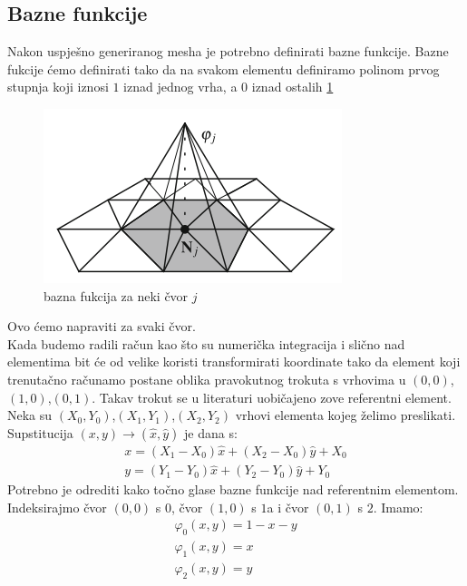 \documentclass[zavrsnirad]{../fer}
\begin{document}
\newpage
\subsection{Bazne funkcije}

Nakon uspješno generiranog mesha je potrebno definirati
bazne funkcije. Bazne fukcije ćemo definirati tako da
na svakom elementu definiramo polinom prvog stupnja koji
iznosi $1$ iznad jednog vrha, a $0$ iznad ostalih \ref{baznaFja}
\begin{figure}[htb]
	\centering
	\includegraphics[width=0.5\linewidth]{Figures/baznaFja.png}
	\caption{bazna fukcija za neki čvor $j$}
	\label{baznaFja}
\end{figure}
Ovo ćemo napraviti za svaki čvor. 
\bigskip
\\ 
Kada budemo radili račun kao što su numerička integracija i 
slično nad elementima bit će od velike koristi transformirati
koordinate tako da element koji trenutačno računamo postane 
oblika pravokutnog trokuta s vrhovima u $(0,0)$,$(1,0)$,$(0,1)$. 
Takav trokut se u literaturi uobičajeno zove referentni element.
Neka su $(X_0, Y_0)$,$(X_1, Y_1)$,$(X_2, Y_2)$ vrhovi elementa
kojeg želimo preslikati. Supstitucija $(x, y) \rightarrow (\hat x, \hat y)$
je dana s:
\begin{align}
  x = (X_1 - X_0)\hat x + (X_2 - X_0)\hat y + X_0 \\ 
  y = (Y_1 - Y_0)\hat x +(Y_2 - Y_0) \hat y + Y_0
\end{align}
Potrebno je odrediti kako točno glase bazne funkcije nad 
referentnim elementom.
Indeksirajmo čvor $(0,0)$ s $0$, čvor $(1,0)$ s $1$a i 
čvor $(0, 1)$ s $2$.
Imamo:
\begin{align}
\varphi_0(x,y) = 1 - x - y\\
\varphi_1(x,y) = x\\
\varphi_2(x,y) = y
\end{align}
\newpage
\end{document}
